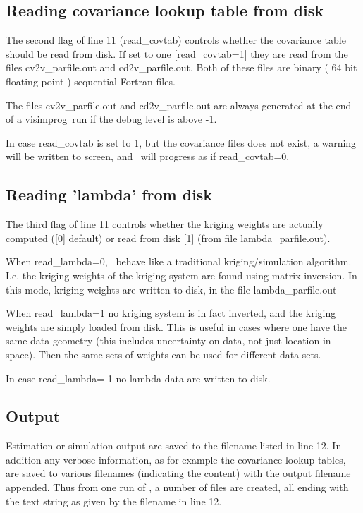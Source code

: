\documentclass[12t]{article}
\begin{document}
\subsection{Reading covariance lookup table from disk}
The second flag of line 11 (read\_covtab) controls whether the covariance table should be read from disk. If set to one [read\_covtab=1] they are read from the files cv2v\_parfile.out and cd2v\_parfile.out. Both of these files are binary ( 64 bit floating point ) sequential Fortran files.

The files cv2v\_parfile.out and cd2v\_parfile.out are always generated at the end of a visimprog~run if the debug level is above -1.

In case read\_covtab is set to 1, but the covariance files does not exist, a warning will be written to screen, and \visimprog~will progress as if read\_covtab=0.
 

\subsection{Reading 'lambda' from disk}
The third flag of line 11 controls whether the kriging weights are actually computed ([0] default) or read from disk [1] (from file lambda\_parfile.out).

When read\_lambda=0, \visimprog~behave like a traditional kriging/simulation algorithm. I.e. the kriging weights of the kriging system are found using matrix inversion. In this mode, kriging weights are written to disk, in the file lambda\_parfile.out

When read\_lambda=1 no kriging system is in fact inverted, and the kriging weights are simply loaded from disk. This is useful in cases where one have the same data geometry (this includes uncertainty on data, not just location in space). Then the same sets of weights can be used for different data sets.

In case read\_lambda=-1 no lambda data are written to disk.


\subsection{Output}
Estimation or simulation output are saved to the filename listed in line 12. In addition any verbose information, as for example the covariance lookup tables, are saved to various filenames (indicating the content) with the output filename appended. Thus from one run of \visimprog, a number of files are created, all ending with the text string as given by the filename in line 12.
\end{document}
